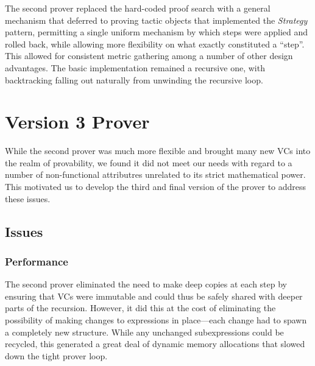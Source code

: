 The second prover replaced the hard-coded proof search with a general mechanism that deferred to proving tactic objects that implemented the \emph{Strategy} pattern, permitting a single uniform mechanism by which steps were applied and rolled back, while allowing more flexibility on what exactly constituted a ``step''.  This allowed for consistent metric gathering among a number of other design advantages.  The basic implementation remained a recursive one, with backtracking falling out naturally from unwinding the recursive loop.

\section{Version 3 Prover}

While the second prover was much more flexible and brought many new VCs into the realm of provability, we found it did not meet our needs with regard to a number of non-functional attributres unrelated to its strict mathematical power.  This motivated us to develop the third and final version of the prover to address these issues.

	\subsection{Issues}

		\subsubsection{Performance}

The second prover eliminated the need to make deep copies at each step by ensuring that VCs were immutable and could thus be safely shared with deeper parts of the recursion.  However, it did this at the cost of eliminating the possibility of making changes to expressions in place---each change had to spawn a completely new structure.  While any unchanged subexpressions could be recycled, this generated a great deal of dynamic memory allocations that slowed down the tight prover loop.


